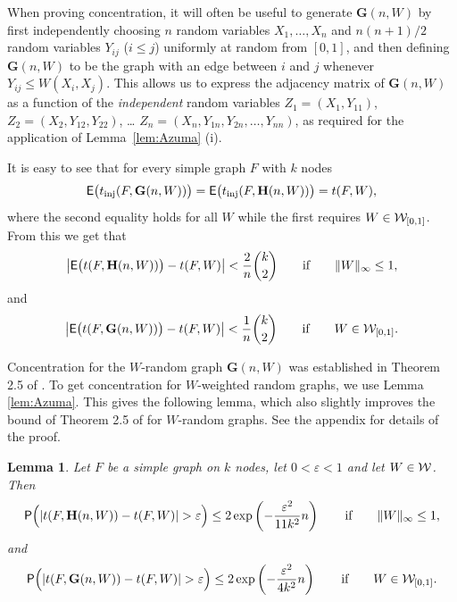 \documentclass[12pt]{article}
\newtheorem{lemma}[theorem]{Lemma}
\numberwithin{equation}{section}
\def\inj{{\rm inj}}
\def\inj{{\rm inj}}
\def\eps{\varepsilon}
\def\Prob{{\sf P}}
\def\E{{\sf E}}
\def\bG{{\mathbf G}}
\def\bH{{\mathbf H}}
\def\WWz{{\WW_{[0,1]}}}
\begin{document}
{When proving concentration, it will often be useful to generate
$\bG(n,W)$ by first independently choosing $n$ random
variables $X_1,\dots,X_n$ and $n(n+1)/2$ random variables
$Y_{ij}$ ($i\leq j$) uniformly at random from $[0,1]$,
and then defining $\bG(n,W)$ to be the graph with an edge
between $i$ and $j$ whenever $Y_{ij}\leq W(X_i,X_j)$.
This allows us to express the adjacency matrix of
$\bG(n,W)$ as a function of the {\it independent}
random variables $Z_1=(X_1,Y_{11})$,
$Z_2=(X_2,Y_{12},Y_{22})$, \dots
$Z_n=(X_n,Y_{1n},Y_{2n},\dots,Y_{nn})$, as required for the application of
Lemma~\ref{lem:Azuma} (i).}

It is easy to see that for every simple graph $F$ with $k$ nodes
\begin{equation}
\label{W-random-Exp} \E\bigl(t_\inj(F,\bG(n,W))\bigr)=
\E\bigl(t_\inj(F,\bH(n,W))\bigr)= t(F,W),
\end{equation}
where the second equality holds for all $W$ while the first requires
$W\in\WWz$. From this we get that
\begin{equation}
\label{random-W-Exp-t}
\bigl|\E\bigl(t(F,\bH(n,W))\bigr)- t(F,W)\bigr|<\frac{
2}n\binom{k}{2}
\qquad\text{if}\qquad {\|W\|_\infty\leq 1,}
\end{equation}and
\begin{equation}
\label{W-random-Exp-t}
\bigl|\E\bigl(t(F,\bG(n,W))\bigr)-
t(F,W)\bigr|<\frac{1}n\binom{k}{2}
\qquad\text{if}\qquad{W\in\WWz.}
\end{equation}

Concentration for the $W$-random graph $\bG(n,W)$ was established in
Theorem 2.5 of \cite{LSz1}. To get concentration for $W$-weighted
random graphs, we use Lemma \ref{lem:Azuma}. This gives the following
lemma, which also slightly improves the bound of Theorem 2.5 of \cite{LSz1}
for $W$-random graphs.
See the appendix for details of the proof.

\begin{lemma}\label{lem:t-conc}
Let $F$ be a simple graph on $k$ nodes, let $0<\eps<1$
and let $W\in{\cal W}$.  Then
\begin{equation}
\label{WH-Concentr} \Prob\Bigl(|t(F,\bH(n,W))-t(F,W)| > \eps
\Bigr) \le 2\exp\left(-\frac{\eps^2}{{
11}k^2}n\right)
\qquad\text{if}\qquad {\|W\|_\infty\leq 1,}
\end{equation}
and
\begin{equation}
\label{WG-Concentr} \Prob\Bigl(|t(F,\bG(n,W))-t(F,W)| > \eps \Bigr)
\le 2\exp\left(-\frac{\eps^2}{4k^2}n\right)
\qquad\text{if}\qquad {W\in\WWz.}
\end{equation}
\end{lemma}
\end{document}

